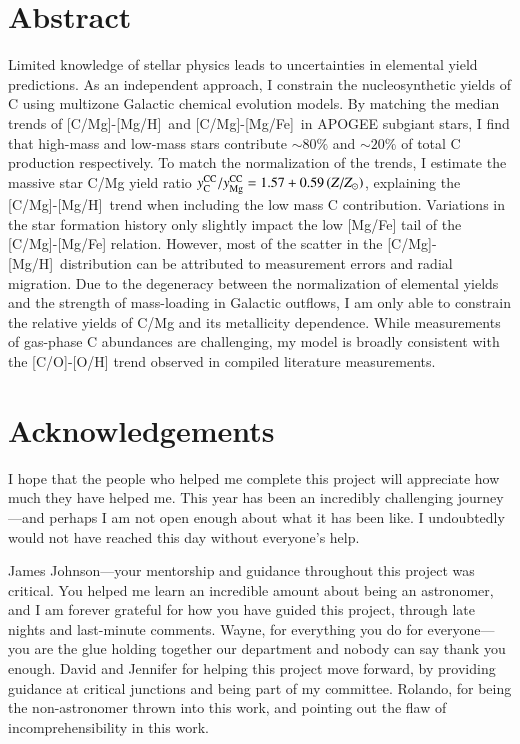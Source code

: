 \documentclass[12pt,oneside,letterpaper]{report}
\newcommand{\caah}{[C/Mg]-[Mg/H]}
\newcommand{\caafe}{[C/Mg]-[Mg/Fe]}
\newcommand{\Ycc}{\ensuremath{y_{\rm C}^{\rm CC}}}
\newcommand{\Yoc}{\ensuremath{y_{\rm Mg}^{\rm CC}}}
\newcommand{\about}[1]{${\sim} #1$}
\begin{document}
\chapter*{Abstract}
Limited knowledge of stellar physics leads to uncertainties in elemental yield predictions.
As an independent approach, I constrain the nucleosynthetic yields of C using multizone Galactic chemical evolution models.
By matching the median trends of \caah\ and \caafe\ in  {\sc APOGEE} subgiant stars, I find that high-mass and low-mass stars contribute \about{80\%} and \about{20\%} of total C production respectively.
% 
To match the normalization of the trends, I estimate the massive star C/Mg yield ratio $\Ycc/\Yoc = 1.57 + 0.59 \left(Z/Z_\odot\right)$,  explaining the \caah\ trend when including the low mass C contribution.
%
Variations in the star formation history only slightly impact the low [Mg/Fe] tail of the [C/Mg]-[Mg/Fe] relation. However, most of the scatter in the \caah\ distribution can be attributed to measurement errors and radial migration. 
% 
Due to the degeneracy between the normalization of elemental yields and the strength of mass-loading in Galactic outflows, I am only able to constrain the relative yields of C/Mg and its metallicity dependence. While measurements of gas-phase C abundances are challenging, my model is broadly consistent with the [C/O]-[O/H] trend observed in compiled literature measurements.





\chapter*{Acknowledgements}


I hope that the people who helped me complete this project will appreciate how much they have helped me. This year has been an incredibly challenging journey---and perhaps I am not open enough about what it has been like. I undoubtedly would not have reached this day without everyone's help.

James Johnson---your mentorship and guidance throughout this project was critical. 
You helped me learn an incredible amount about being an astronomer, and I am forever grateful for how you have guided this project, through late nights and last-minute comments.  Wayne, for everything you do for everyone---you are the glue holding together our department and nobody can say thank you enough. 
David and Jennifer for helping this project move forward, by providing guidance at critical junctions and being part of my committee. Rolando, for being the non-astronomer thrown into this work, and pointing out the flaw of incomprehensibility in this work.
\end{document}
